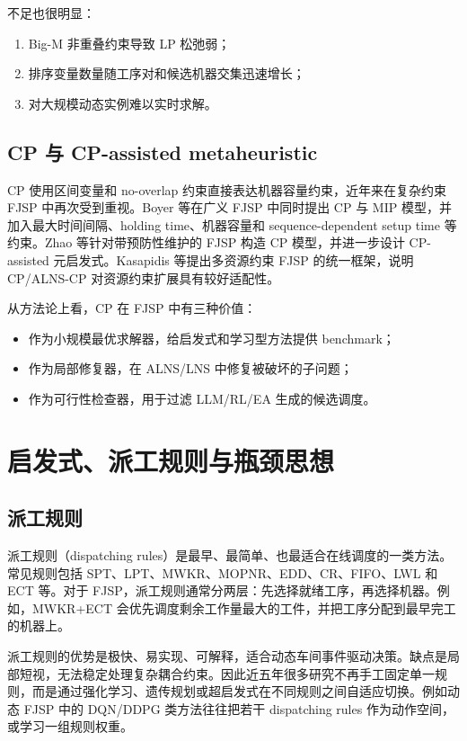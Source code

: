 \documentclass[UTF8,a4paper,11pt]{ctexart}
\begin{document}
不足也很明显：
\begin{enumerate}
    \item Big-M 非重叠约束导致 LP 松弛弱；
    \item 排序变量数量随工序对和候选机器交集迅速增长；
    \item 对大规模动态实例难以实时求解。
\end{enumerate}

\subsection{CP 与 CP-assisted metaheuristic}

CP 使用区间变量和 no-overlap 约束直接表达机器容量约束，近年来在复杂约束 FJSP 中再次受到重视。Boyer 等在广义 FJSP 中同时提出 CP 与 MIP 模型，并加入最大时间间隔、holding time、机器容量和 sequence-dependent setup time 等约束\cite{Boyer2021GFJSP}。Zhao 等针对带预防性维护的 FJSP 构造 CP 模型，并进一步设计 CP-assisted 元启发式\cite{Zhao2025CPPM}。Kasapidis 等提出多资源约束 FJSP 的统一框架，说明 CP/ALNS-CP 对资源约束扩展具有较好适配性\cite{Kasapidis2025Unified}。

从方法论上看，CP 在 FJSP 中有三种价值：
\begin{itemize}
    \item 作为小规模最优求解器，给启发式和学习型方法提供 benchmark；
    \item 作为局部修复器，在 ALNS/LNS 中修复被破坏的子问题；
    \item 作为可行性检查器，用于过滤 LLM/RL/EA 生成的候选调度。
\end{itemize}

\section{启发式、派工规则与瓶颈思想}

\subsection{派工规则}

派工规则（dispatching rules）是最早、最简单、也最适合在线调度的一类方法。常见规则包括 SPT、LPT、MWKR、MOPNR、EDD、CR、FIFO、LWL 和 ECT 等。对于 FJSP，派工规则通常分两层：先选择就绪工序，再选择机器。例如，MWKR+ECT 会优先调度剩余工作量最大的工件，并把工序分配到最早完工的机器上。

派工规则的优势是极快、易实现、可解释，适合动态车间事件驱动决策。缺点是局部短视，无法稳定处理复杂耦合约束。因此近五年很多研究不再手工固定单一规则，而是通过强化学习、遗传规划或超启发式在不同规则之间自适应切换。例如动态 FJSP 中的 DQN/DDPG 类方法往往把若干 dispatching rules 作为动作空间，或学习一组规则权重\cite{Gui2023DDPG,Wang2022MORL}。
\end{document}
